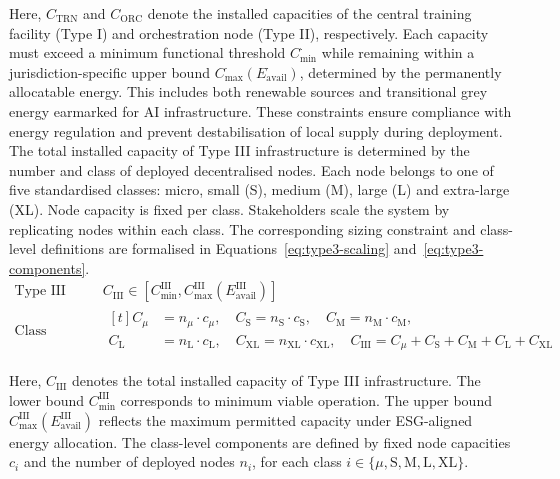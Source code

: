 \documentclass[oneside,10pt]{swissi}
\begin{document}
Here, \( C_{\text{TRN}} \) and \( C_{\text{ORC}} \) denote the installed capacities of the central training facility (Type I) and orchestration node (Type II), respectively. Each capacity must exceed a minimum functional threshold \( C_{\text{min}}^{\cdot} \) while remaining within a jurisdiction-specific upper bound \( C_{\text{max}}^{\cdot}(E_{\text{avail}}^{\cdot}) \), determined by the permanently allocatable energy. This includes both renewable sources and transitional grey energy earmarked for AI infrastructure. These constraints ensure compliance with energy regulation and prevent destabilisation of local supply during deployment. The total installed capacity of Type III infrastructure is determined by the number and class of deployed decentralised nodes. Each node belongs to one of five standardised classes: micro, small (S), medium (M), large (L) and extra-large (XL). Node capacity is fixed per class. Stakeholders scale the system by replicating nodes within each class. The corresponding sizing constraint and class-level definitions are formalised in Equations~\eqref{eq:type3-scaling} and~\eqref{eq:type3-components}.
\begin{align}
  \text{Type III capacity:} \quad & C_{\text{III}} \in [C_{\text{min}}^{\text{III}}, C_{\text{max}}^{\text{III}}(E_{\text{avail}}^{\text{III}})] \label{eq:type3-scaling} \\
  \text{Class capacities:} \quad &
  \begin{aligned}[t]
  C_{\mu} &= n_{\mu} \cdot c_{\mu}, \quad
  C_{\text{S}} = n_{\text{S}} \cdot c_{\text{S}}, \quad
  C_{\text{M}} = n_{\text{M}} \cdot c_{\text{M}}, \\
  C_{\text{L}} &= n_{\text{L}} \cdot c_{\text{L}}, \quad
  C_{\text{XL}} = n_{\text{XL}} \cdot c_{\text{XL}}, \quad
  C_{\text{III}} = C_{\mu} + C_{\text{S}} + C_{\text{M}} + C_{\text{L}} + C_{\text{XL}}
  \end{aligned}
  \label{eq:type3-components}
\end{align}

Here, \( C_{\text{III}} \) denotes the total installed capacity of Type III infrastructure. The lower bound \( C_{\text{min}}^{\text{III}} \) corresponds to minimum viable operation. The upper bound \( C_{\text{max}}^{\text{III}}(E_{\text{avail}}^{\text{III}}) \) reflects the maximum permitted capacity under ESG-aligned energy allocation. The class-level components are defined by fixed node capacities \( c_{i} \) and the number of deployed nodes \( n_{i} \), for each class \( i \in \{\mu, \text{S}, \text{M}, \text{L}, \text{XL}\} \).
\end{document}
